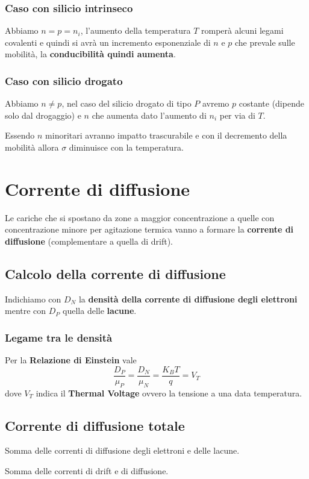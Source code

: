 \documentclass[11pt,a4paper,]{article}
\begin{document}
\subsubsection{Caso con silicio intrinseco}
Abbiamo $n=p=n_i$, l'aumento della temperatura $T$ romperà alcuni legami covalenti e quindi si avrà un incremento esponenziale di $n$ e $p$ che prevale sulle mobilità, la \textbf{conducibilità quindi aumenta}.
\subsubsection{Caso con silicio drogato}
Abbiamo $n\neq p$, nel caso del silicio drogato di tipo $P$ avremo $p$ costante (dipende solo dal drogaggio) e $n$ che aumenta dato l'aumento di $n_i$ per via di $T$.

Essendo $n$ minoritari avranno impatto trascurabile e con il decremento della mobilità allora $\sigma$ diminuisce con la temperatura.

\section{Corrente di diffusione}
Le cariche che si spostano da zone a maggior concentrazione a quelle con concentrazione minore per agitazione termica vanno a formare la \textbf{corrente di diffusione} (complementare a quella di drift).
\subsection{Calcolo della corrente di diffusione}
Indichiamo con $D_N$ la \textbf{densità della corrente di diffusione degli elettroni} mentre con $D_P$ quella delle \textbf{lacune}.
\subsubsection{Legame tra le densità}
Per la \textbf{Relazione di Einstein} vale
\[
\frac{D_P}{\mu_P} = \frac{D_N}{\mu_N} = \frac{K_B T}{q} = V_T
\]
dove $V_T$ indica il \textbf{Thermal Voltage} ovvero la tensione a una data temperatura.
\subsection{Corrente di diffusione totale}
\begin{definizione}
    Somma delle correnti di diffusione degli elettroni e delle lacune.
\end{definizione}
\begin{definizione}
    Somma delle correnti di drift e di diffusione.
\end{definizione}
\end{document}
